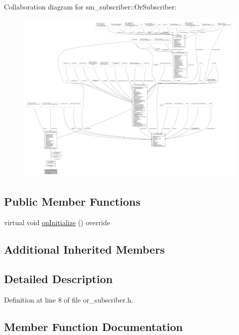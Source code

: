 Collaboration diagram for sm\+\_\+subscriber\+:\+:Or\+Subscriber\+:
\nopagebreak
\begin{figure}[H]
\begin{center}
\leavevmode
\includegraphics[width=350pt]{classsm__subscriber_1_1OrSubscriber__coll__graph}
\end{center}
\end{figure}
\subsection*{Public Member Functions}
\begin{DoxyCompactItemize}
\item 
virtual void \hyperlink{classsm__subscriber_1_1OrSubscriber_a58ac0563654fc1da27717b35acf4f810}{on\+Initialize} () override
\end{DoxyCompactItemize}
\subsection*{Additional Inherited Members}


\subsection{Detailed Description}


Definition at line 8 of file or\+\_\+subscriber.\+h.



\subsection{Member Function Documentation}
\mbox{\label{classsm__subscriber_1_1OrSubscriber_a58ac0563654fc1da27717b35acf4f810}} 

